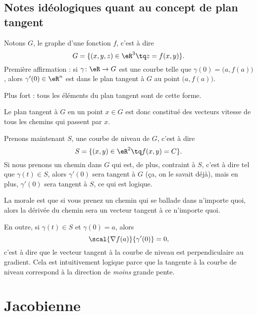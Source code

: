                     \subsection{Notes idéologiques quant au concept de plan tangent}
\label{ssecConceptPlanTag}

Notons $G$, le graphe d'une fonction $f$, c'est à dire
\begin{equation}
    G=\{ (x,y,z)\in\eR^3\tq z=f(x,y) \}.
\end{equation}
Première affirmation : si $\gamma\colon \eR\to G$ est une courbe telle que $\gamma(0)=\big( a,f(a) \big)$, alors $\gamma'(0)\in\eR^n$ est dans le plan tangent à $G$ au point $\big( a,f(a) \big)$.

Plus fort : tous les éléments du plan tangent sont de cette forme.

Le plan tangent à $G$ en un point $x\in G$ est donc constitué des vecteurs vitesse de tous les chemins qui passent par $x$.

Prenons maintenant $S$, une courbe de niveau de $G$, c'est à dire
\begin{equation}
    S=\{ (x,y)\in\eR^2\tq f(x,y)=C \}.
\end{equation}
Si nous prenons un chemin dans $G$ qui est, de plus, contraint à $S$, c'est à dire tel que $\gamma(t)\in S$, alors $\gamma'(0)$ sera tangent à $G$ (ça, on le savait déjà), mais en plus, $\gamma'(0)$ sera tangent à $S$, ce qui est logique.

La morale est que si vous prenez un chemin qui se ballade dans n'importe quoi, alors la dérivée du chemin sera un vecteur tangent à ce n'importe quoi.

En outre, si $\gamma(t)\in S$ et $\gamma(0)=a$, alors
\begin{equation}
    \scal{\nabla f(a)}{\gamma'(0)}=0,
\end{equation}
c'est à dire que le vecteur tangent à la courbe de niveau est perpendiculaire au gradient. Cela est intuitivement logique parce que la tangente à la courbe de niveau correspond à la direction de \emph{moins} grande pente.


\section{Jacobienne}

